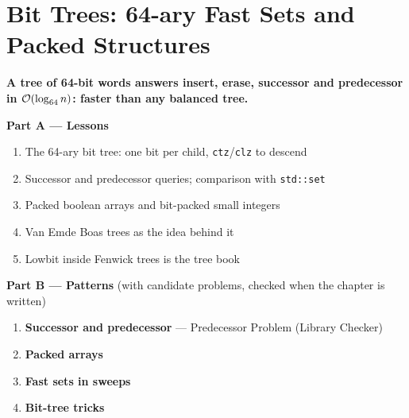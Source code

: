 \chapter{Bit Trees: 64-ary Fast Sets and Packed Structures}
\label{ch:bit_trees}

\begin{tcolorbox}[enhanced, colback=white, colframe=secondaryblue, boxrule=1pt, arc=2mm]
\textbf{\large\textcolor{primaryblue}{A tree of 64-bit words answers insert, erase, successor and predecessor in $\mathcal{O}(\log_{64} n)$: faster than any balanced tree.}}
\end{tcolorbox}


\begin{plannedbox}
\textbf{Part A --- Lessons}
\begin{enumerate}[leftmargin=*, label=\textbf{A\arabic*.}, itemsep=1pt]
    \item The 64-ary bit tree: one bit per child, \texttt{ctz}/\texttt{clz} to descend
    \item Successor and predecessor queries; comparison with \texttt{std::set}
    \item Packed boolean arrays and bit-packed small integers
    \item Van Emde Boas trees as the idea behind it
    \item Lowbit inside Fenwick trees is the tree book
\end{enumerate}
\textbf{Part B --- Patterns} (with candidate problems, checked when the chapter is written)
\begin{enumerate}[leftmargin=*, label=\textbf{P\arabic*.}, itemsep=1pt]
    \item \textbf{Successor and predecessor} --- Predecessor Problem {\small\color{darkgray}(Library Checker)}
    \item \textbf{Packed arrays}
    \item \textbf{Fast sets in sweeps}
    \item \textbf{Bit-tree tricks}
\end{enumerate}
\end{plannedbox}
